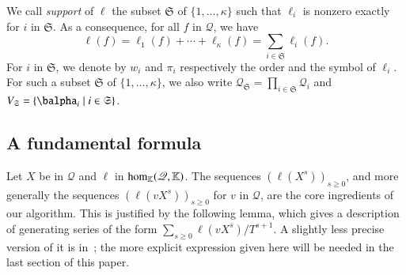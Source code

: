 \documentclass[final,1p,times,authoryear]{elsarticle}
\newcommand{\lf}{X}
\newcommand{\residueI}{\mathscr{Q}}
\def\dg{\kappa}
\def\K{\mathbb{K}}
\def\K {\ensuremath{\mathbb{K}}}
\begin{document}
We call {\em support} of $\ell$ the subset $\mathfrak{S}$ of
$\{1,\dots,\dg\}$ such that $\ell_i$ is nonzero exactly for $i$ in
$\mathfrak{S}$.  As a consequence, for all $f$ in $\residueI$, we have
\begin{equation}\label{eq:fui}
  \ell(f) = \ell_1(f) + \cdots + \ell_\dg(f)
  =  \sum_{i \in \mathfrak{S}} \ell_i(f).
\end{equation}
For $i$ in $\mathfrak{S}$, we denote by $w_i$ and $\pi_i$ respectively
the order and the symbol of $\ell_i$. For such a subset $\mathfrak{S}$
of $\{1,\dots,\dg\}$, we also write $\residueI_\mathfrak{S}=\prod_{i
  \in \mathfrak{S}} \residueI_i$ and $V_\mathfrak{S}= \{\balpha_i \mid
i \in \mathfrak{S}\}$.


\subsection{A fundamental formula}  \label{ssec:genseries}

Let $\lf$ be in $\residueI$ and $\ell$ in ${\rm hom}_\K(\residueI,\K)$.  The
sequences $(\ell(\lf^s))_{s\ge 0}$, and more generally the sequences $(\ell(v
\lf^s))_{s\ge 0}$ for $v$ in $\residueI$, are the core ingredients of our
algorithm.  This is justified by the following lemma, which gives a
description of generating series of the form $\sum_{s \ge 0} \ell(v
\lf^s)/T^{s+1}$. A slightly less precise version of it is in~\citep{BoSaSc03};
the more explicit expression given here will be needed in the last section of
this paper.
\end{document}
